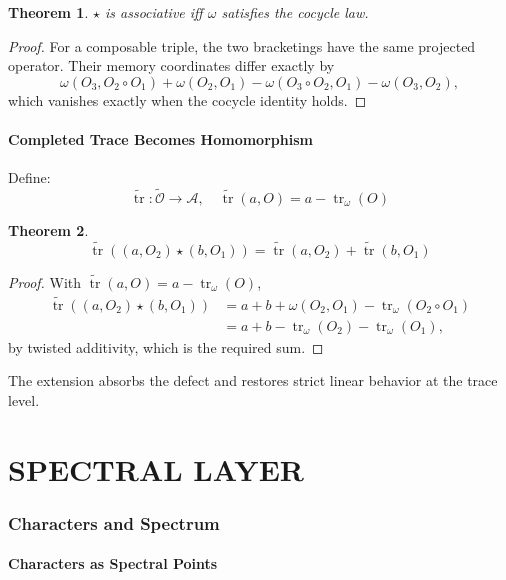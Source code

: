 \documentclass[12pt, oneside]{article}
\newtheorem{theorem}{Theorem}[section]
\DeclareMathOperator{\tr}{tr}
\newcommand{\A}{\mathcal{A}}
\newcommand{\Opr}{\mathcal{O}}
\begin{document}
\begin{theorem}
$\star$ is associative iff $\omega$ satisfies the cocycle law.
\end{theorem}
\begin{proof}
For a composable triple, the two bracketings have the same projected operator. Their memory coordinates differ exactly by
\[
\omega(O_3,O_2\circ O_1)+\omega(O_2,O_1)-\omega(O_3\circ O_2,O_1)-\omega(O_3,O_2),
\]
which vanishes exactly when the cocycle identity holds.
\end{proof}

\subsection{Completed Trace Becomes Homomorphism}

Define:
\begin{equation}
\widetilde{\tr}: \widetilde{\Opr} \rightarrow \A, \quad \widetilde{\tr}(a, O) = a - \tr_\omega(O)
\end{equation}

\begin{theorem}
\begin{equation}
\widetilde{\tr}((a, O_2) \star (b, O_1)) = \widetilde{\tr}(a, O_2) + \widetilde{\tr}(b, O_1)
\end{equation}
\end{theorem}
\begin{proof}
With $\widetilde{\tr}(a,O)=a-\tr_\omega(O)$,
\[
\begin{aligned}
\widetilde{\tr}((a,O_2)\star(b,O_1))
&=a+b+\omega(O_2,O_1)-\tr_\omega(O_2\circ O_1)\\
&=a+b-\tr_\omega(O_2)-\tr_\omega(O_1),
\end{aligned}
\]
by twisted additivity, which is the required sum.
\end{proof}

The extension absorbs the defect and restores strict linear behavior at the trace level.

\newpage

\part{SPECTRAL LAYER}

\section{Characters and Spectrum}

\subsection{Characters as Spectral Points}
\end{document}
